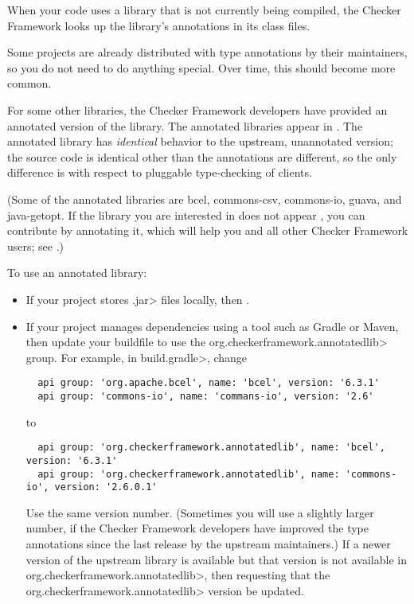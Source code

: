 When your code uses a library that is not currently being compiled, the
Checker Framework looks up the library's annotations in its class files.

Some projects are already distributed with type annotations by their
maintainers, so you do not need to do anything special.
Over time, this should become more common.

For some other libraries, the Checker Framework developers have provided an
annotated version of the library.
The annotated libraries appear in
.
The annotated library has \emph{identical} behavior to the upstream,
unannotated version; the source code is identical other than the
annotations are different, so the only difference is with respect to
pluggable type-checking of clients.

(Some of the annotated libraries are
bcel,
commons-csv,
commons-io,
guava,
and
java-getopt.
If the library you are interested in does not appear
, you can contribute by annotating it, which will
help you and all other Checker Framework users; see
.)

To use an annotated library:

\begin{itemize}
\item
If your project stores \<.jar> files locally, then
.

\item
If your project manages dependencies using a tool such as Gradle or Maven,
then update your buildfile to use the \<org.checkerframework.annotatedlib>
group.  For example, in \<build.gradle>, change

\begin{Verbatim}
  api group: 'org.apache.bcel', name: 'bcel', version: '6.3.1'
  api group: 'commons-io', name: 'commans-io', version: '2.6'
\end{Verbatim}

\noindent
to

\begin{Verbatim}
  api group: 'org.checkerframework.annotatedlib', name: 'bcel', version: '6.3.1'
  api group: 'org.checkerframework.annotatedlib', name: 'commons-io', version: '2.6.0.1'
\end{Verbatim}

\noindent
Use the same version number.  (Sometimes you will use a slightly larger
number, if the Checker Framework developers have improved the type
annotations since the last release by the upstream maintainers.)  If a
newer version of the upstream library is available but that version is not
available in \<org.checkerframework.annotatedlib>, then
 requesting that the
\<org.checkerframework.annotatedlib> version be updated.
\end{itemize}

